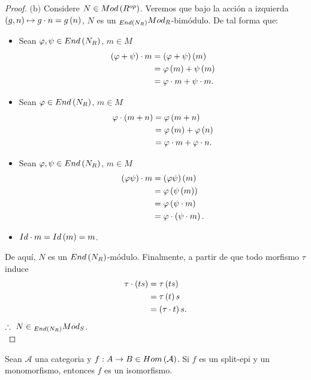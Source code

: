 \documentclass{article}
\begin{document}
\begin{enumerate}[label=\textbf{Ej \arabic*.}]
\begin{proof}
			$\boxed{\text{(b)}}$ Considere $N \in Mod\left(R^{op}\right)$. Veremos que bajo la acción a izquierda $\left(g,n\right) \mapsto g \cdot n = g\left(n\right)$, $N$ es un $_{End\left(N_{R}\right)}Mod_{R}$-bimódulo. De tal forma que:
			\begin{itemize}
				\item Sean $\varphi , \psi \in End\left(N_{R}\right)$, $m \in M$
				\begin{align*}
					\left( \varphi + \psi \right) \cdot m&=\left( \varphi + \psi \right)\left(m\right)\\
					&=\varphi \left(m\right) + \psi \left(m\right)\\
					&=\varphi \cdot m + \psi \cdot m.
				\end{align*}
				\item Sean $\varphi\in End\left(N_{R}\right)$, $m \in M$
				\begin{align*}
					\varphi\cdot\left(m+n\right)&=\varphi\left(m+n\right)\\
					&=\varphi\left(m\right)+\varphi\left(n\right)\\
					&=\varphi \cdot m + \varphi \cdot n.
				\end{align*}
				\item Sean $\varphi , \psi \in End\left(N_{R}\right)$, $m \in M$
				\begin{align*}
					\left( \varphi\psi \right) \cdot m&=\left( \varphi\psi \right)\left(m\right)\\
					&=\varphi \left( \psi \left(m\right)\right)\\
					&=\varphi \left( \psi \cdot m\right)\\
					&=\varphi \cdot \left( \psi \cdot m\right).
				\end{align*}
				\item $Id \cdot m=Id\left(m\right)=m$.
			\end{itemize}
			De aquí, $N$ es un $End\left(N_{R}\right)$-módulo. Finalmente, a partir de que todo morfismo $\tau$ induce 
			\begin{align*}
				\tau \cdot \left(ts\right) &= \tau \left(ts\right)\\
				&=\tau \left(t\right)s\\
				&=\left( \tau \cdot t \right)s.
			\end{align*}
			$\therefore\ N \in {}_{End\left(N_{R}\right)}Mod_{S}$.\\
		\end{proof}
	\end{enumerate}
\begin{lem}
	Sean $\mathcal{A}$ una categoria y $f:A\to B \in Hom\left(\mathcal{A}\right)$. Si $f$ es un split-epi y un monomorfismo, entonces $f$ es un isomorfismo.	
\end{lem}
\end{document}
